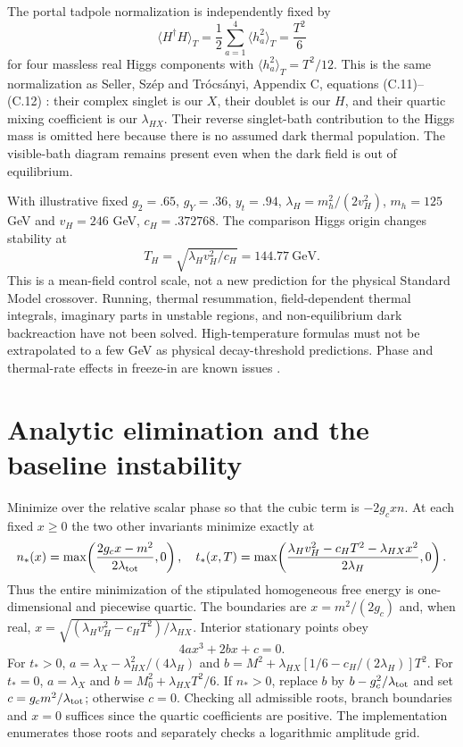 \documentclass[11pt]{article}
\newcommand{\lp}{\lambda_{HX}}
\newcommand{\lt}{\lambda_{\rm tot}}
\begin{document}
The portal tadpole normalization is independently fixed by
\begin{equation}
 \langle H^\dagger H\rangle_T=
 \frac12\sum_{a=1}^4\langle h_a^2\rangle_T=\frac{T^2}{6}
\end{equation}
for four massless real Higgs components with
$\langle h_a^2\rangle_T=T^2/12$. This is the same normalization as
Seller, Sz\'ep and Tr\'ocs\'anyi, Appendix C, equations (C.11)--(C.12)
\cite{seller}: their complex singlet is our $X$, their doublet is our $H$,
and their quartic mixing coefficient is our $\lp$. Their reverse singlet-bath
contribution to the Higgs mass is omitted here because there is no assumed
dark thermal population. The visible-bath diagram remains present even
when the dark field is out of equilibrium.

With illustrative fixed $g_2=.65$, $g_Y=.36$, $y_t=.94$,
$\lambda_H=m_h^2/(2v_H^2)$, $m_h=125$ GeV and $v_H=246$ GeV,
$c_H=.372768$. The comparison Higgs origin changes stability at
\begin{equation}
 T_H=\sqrt{\lambda_Hv_H^2/c_H}=144.77\ \mathrm{GeV}.
\end{equation}
This is a mean-field control scale, not a new prediction for the physical
Standard Model crossover. Running, thermal resummation, field-dependent
thermal integrals, imaginary parts in unstable regions, and non-equilibrium
dark backreaction have not been solved. High-temperature formulas must not
be extrapolated to a few GeV as physical decay-threshold predictions.
Phase and thermal-rate effects in freeze-in are known issues \cite{deromeri}.

\section{Analytic elimination and the baseline instability}
Minimize over the relative scalar phase so that the cubic term is
$-2g_cxn$. At each fixed $x\ge0$ the two other invariants minimize exactly at
\begin{equation}
 n_*(x)=\max\!\left(\frac{2g_cx-m^2}{2\lt},0\right),\quad
 t_*(x,T)=\max\!\left(\frac{\lambda_Hv_H^2-c_HT^2-\lp x^2}
 {2\lambda_H},0\right).
\label{eq:elim}
\end{equation}
Thus the entire minimization of the stipulated homogeneous free energy is
one-dimensional and piecewise quartic. The boundaries are
$x=m^2/(2g_c)$ and, when real,
$x=\sqrt{(\lambda_Hv_H^2-c_HT^2)/\lp}$.
Interior stationary points obey
\begin{equation}
 4a x^3+2b x+c=0.
\end{equation}
For $t_*>0$,
$a=\lambda_X-\lp^2/(4\lambda_H)$ and
$b=M^2+\lp[1/6-c_H/(2\lambda_H)]T^2$.
For $t_*=0$, $a=\lambda_X$ and $b=M_0^2+\lp T^2/6$.
If $n_*>0$, replace $b$ by $b-g_c^2/\lt$ and set
$c=g_cm^2/\lt$; otherwise $c=0$.
Checking all admissible roots, branch boundaries and $x=0$ suffices since
the quartic coefficients are positive. The implementation enumerates those
roots and separately checks a logarithmic amplitude grid.
\end{document}
